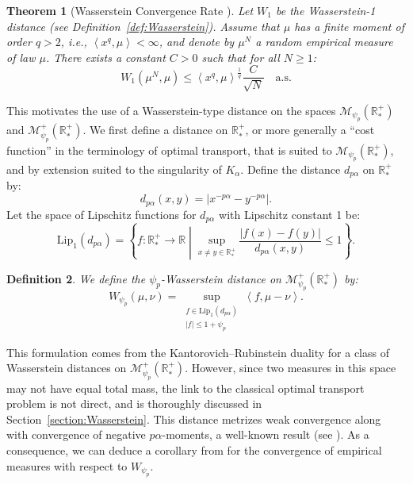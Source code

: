 \documentclass[11pt,a4paper]{article}
\newcommand{\RR}{\mathbb{R}}
\newcommand{\RRP}{\mathbb{R}^+_*}
\newcommand{\MC}{\mathcal{M}}
\newcommand{\brac}[1]{\left\langle#1\right\rangle}
\newtheorem{theorem}{Theorem}[section]
\newtheorem{definition}[theorem]{Definition}
\begin{document}
\begin{theorem}[Wasserstein Convergence Rate {\cite{fournier2015rate}}]\label{thm:fournier-guillin}
Let $W_1$ be the Wasserstein-1 distance (see Definition~\ref{def:Wasserstein}). Assume that $\mu$ has a finite moment of order $q > 2$, i.e., $\brac{x^q,\mu} < \infty$, and denote by $\mu^N$ a random empirical measure of law $\mu$. There exists a constant $C > 0$ such that for all $N \geq 1$:
\[
W_1\left(\mu^N, \mu\right) \leq \brac{x^q,\mu}^{\frac{1}{q}} \dfrac{C}{\sqrt{N}} \quad \text{a.s.}
\]
\end{theorem}

This motivates the use of a Wasserstein-type distance on the spaces $\MC_{\psi_p}(\RRP)$ and $\MC^+_{\psi_p}(\RRP)$. We first define a distance on $\RRP$, or more generally a “cost function” in the terminology of optimal transport, that is suited to $\MC_{\psi_p}(\RRP)$, and by extension suited to the singularity of $K_\alpha$. Define the distance $d_{p\alpha}$ on $\RRP$ by:
\[
d_{p\alpha}(x, y) = |x^{-p\alpha} - y^{-p\alpha}|.
\]
Let the space of Lipschitz functions for $d_{p\alpha}$ with Lipschitz constant 1 be:
\[
\text{Lip}_1(d_{p\alpha}) = \left\lbrace f: \RRP \to \RR \middle| \sup_{x \neq y \in \RRP} \dfrac{|f(x) - f(y)|}{d_{p\alpha}(x, y)} \leq 1 \right\rbrace.
\]
\begin{definition}
We define the $\psi_p$-Wasserstein distance on $\MC^+_{\psi_p}\left(\RRP \right)$ by:
\[
W_{\psi_p}(\mu, \nu) = \sup_{\substack{f \in \text{Lip}_1(d_{p\alpha}) \\ |f| \leq 1 + \psi_p}} \brac{f, \mu - \nu}.
\]
\end{definition}

This formulation comes from the Kantorovich–Rubinstein duality for a class of Wasserstein distances on $\MC^+_{\psi_p}(\RRP)$. However, since two measures in this space may not have equal total mass, the link to the classical optimal transport problem is not direct, and is thoroughly discussed in Section~\ref{section:Wasserstein}. This distance metrizes weak convergence along with convergence of negative $p\alpha$-moments, a well-known result (see \cite{villani2008optimal}). As a consequence, we can deduce a corollary from \cite{fournier2015rate} for the convergence of empirical measures with respect to $W_{\psi_p}$.
\end{document}

